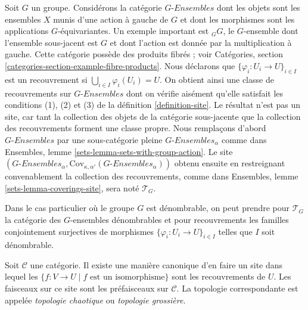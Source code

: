 \begin{example}
\label{example-site-on-group}
Soit $G$ un groupe. Considérons la catégorie $G\textit{-Ensembles}$ dont les objets
sont les ensembles $X$ munis d’une action à gauche de $G$ et dont les
morphismes sont les applications $G$-équivariantes. Un exemple important est
${}_GG$, le $G$-ensemble dont l’ensemble sous-jacent est $G$ et dont l’action
est donnée par la multiplication à gauche. Cette catégorie possède des
produits fibrés ; voir Catégories,
section \ref{categories-section-example-fibre-products}.
Nous déclarons que $\{\varphi_i : U_i \to U\}_{i\in I}$ est un recouvrement si
$\bigcup_{i\in I} \varphi_i(U_i) = U$. On obtient ainsi une classe de
recouvrements sur $G\textit{-Ensembles}$ dont on vérifie aisément qu’elle satisfait
les conditions (1), (2) et (3) de la définition \ref{definition-site}. Le
résultat n’est pas un site, car tant la collection des objets de la catégorie
sous-jacente que la collection des recouvrements forment une classe propre.
Nous remplaçons d’abord $G\textit{-Ensembles}$ par une sous-catégorie pleine
$G\textit{-Ensembles}_\alpha$ comme dans Ensembles,
lemme \ref{sets-lemma-sets-with-group-action}. Le site
$(G\textit{-Ensembles}_\alpha,
\text{Cov}_{\kappa, \alpha'}(G\textit{-Ensembles}_\alpha))$
obtenu ensuite en restreignant convenablement la collection des recouvrements,
comme dans Ensembles, lemme \ref{sets-lemma-coverings-site}, sera noté
$\mathcal{T}_G$.

\medskip\noindent
Dans le cas particulier où le groupe $G$ est dénombrable, on peut prendre
pour $\mathcal{T}_G$ la catégorie des $G$-ensembles dénombrables et pour
recouvrements les familles conjointement surjectives de morphismes
$\{\varphi_i : U_i \to U\}_{i \in I}$ telles que $I$ soit dénombrable.
\end{example}

\begin{example}
\label{example-indiscrete}
Soit $\mathcal{C}$ une catégorie. Il existe une manière canonique d’en faire
un site dans lequel les $\{f : V \to U \mid f\text{ est un isomorphisme}\}$
sont les recouvrements de $U$. Les faisceaux sur ce site sont les préfaisceaux
sur $\mathcal{C}$. La topologie correspondante est appelée {\it topologie
chaotique} ou {\it topologie grossière}.
\end{example}













